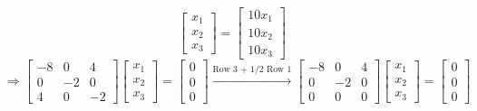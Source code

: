 \begin{enumerate}[label=(\alph*)]
\[                \begin{bmatrix}
                    x_1 \\
                    x_2 \\
                    x_3
                \end{bmatrix}
                =
                \begin{bmatrix}
                    10x_1 \\
                    10x_2 \\
                    10x_3
                \end{bmatrix}
            \]
            \[
                \Rightarrow
                \begin{bmatrix}
                    -8 & 0 & 4 \\
                    0 & -2 & 0 \\
                    4 & 0 & -2
                \end{bmatrix}
                \begin{bmatrix}
                    x_1 \\
                    x_2 \\
                    x_3
                \end{bmatrix}
                =
                \begin{bmatrix}
                    0 \\
                    0 \\
                    0
                \end{bmatrix}
                \overset{\text{Row 3 + 1/2 Row 1}}{\longrightarrow}
                \begin{bmatrix}
                    -8 & 0 & 4 \\
                    0 & -2 & 0 \\
                    0 & 0 & 0
                \end{bmatrix}
                \begin{bmatrix}
                    x_1 \\
                    x_2 \\
                    x_3
                \end{bmatrix}
                =
                \begin{bmatrix}
                    0 \\
                    0 \\
                    0
                \end{bmatrix}
\]
\end{enumerate}
